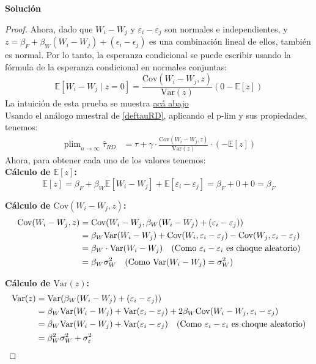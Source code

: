 \documentclass[a4paper, answers, addpoints, 11pt]{exam}
\DeclareMathOperator*{\plim}{plim}
\newenvironment{solucion}{%
  \begin{mdframed}[
    backgroundcolor=blue!5,    %
    linecolor=blue!50,          %
    linewidth=2pt,              %
    leftmargin=10pt,            %
    rightmargin=8pt,           %
    topline=true,              %
    bottomline=true,            %
    roundcorner=10pt,           %
    innerleftmargin=10pt,       %
    innerrightmargin=10pt,      %
    innerbottommargin=10pt,     %
    innertopmargin=10pt         %
  ]%
  \begin{tcolorbox}[colframe=blue!50!black, colback=blue!50, coltitle=white, sharp corners=all, boxrule=1mm, width=\textwidth, halign=left, valign=center, top=0mm, bottom=0mm, left=0mm, right=0mm] \textbf{Solución} \end{tcolorbox} }{\end{mdframed}}
\begin{document}
\begin{enumerate}[resume]
\begin{enumerate}
\begin{solucion}
\begin{proof}
Ahora, dado que \( W_i - W_j \) y \( \varepsilon_i - \varepsilon_j \) son normales e independientes, y \( z= \beta_F + \beta_W(W_i - W_j) + (\epsilon_i - \epsilon_j) \) es una combinación lineal de ellos, también es normal. Por lo tanto, la esperanza condicional se puede escribir usando la fórmula de la esperanza condicional en normales conjuntas:
\[
\mathbb{E}[W_i - W_j \mid z = 0] = \frac{\text{Cov}(W_i - W_j, z)}{\text{Var}(z)} (0 - \mathbb{E}[z])
\]
La intuición de esta prueba se muestra \hyperlink{claimesperanzacondicional}{acá abajo} \\
Usando el análogo muestral de \ref{deftauRD}, aplicando el p-lim y sus propiedades, tenemos:
\begin{align*}
\plim_{n \to \infty} \hat{\tau}_{RD} 
&=  \tau + \gamma \cdot \frac{\text{Cov}(W_i - W_j, z)}{\text{Var}(z)} \cdot (-\mathbb{E}[z])
\end{align*}
Ahora, para obtener cada uno de los valores tenemos:\\
\textbf{Cálculo de  \(\mathbb{E}[z]\):}
\[
\mathbb{E}[z] = \beta_F + \beta_W \mathbb{E}[ W_i - W_j] + \mathbb{E}[\varepsilon_i - \varepsilon_j] = \beta_F + 0 + 0 = \beta_F
\]

\textbf{Cálculo de \(\text{Cov}( W_i - W_j, z)\):}
\begin{align*}
\text{Cov}( W_i - W_j, z)  &= \text{Cov}( W_i - W_j, \beta_W ( W_i - W_j) + (\varepsilon_i - \varepsilon_j)) \\
&= \beta_W  \text{Var}( W_i - W_j) + \text{Cov}
 (  W_i  , \varepsilon_i-\varepsilon_j) -\text{Cov}
 (  W_j , \varepsilon_i-\varepsilon_j) \\
 &= \beta_W \cdot \text{Var}( W_i - W_j)   \quad \text{(Como $ \varepsilon_i-\varepsilon_i$ es choque aleatorio)}\\ 
 &= \beta_W \sigma_W^2 \quad \text{(Como $\text{Var}( W_i - W_j)=\sigma_W^2$)}
\end{align*}

 

\textbf{Cálculo de \(\text{Var}(z)\):}
\begin{align*}
\text{Var}(z) &= \text{Var}(\beta_W ( W_i - W_j) + (\varepsilon_i - \varepsilon_j))\\
& =  \beta_W \text{Var}( W_i - W_j) + \text{Var}(\varepsilon_i - \varepsilon_j)+ 2\beta_W  \text{Cov}(W_i - W_j, \varepsilon_i - \varepsilon_j) \\
& =  \beta_W \text{Var}( W_i - W_j) + \text{Var}(\varepsilon_i - \varepsilon_j) \quad \text{(Como $ \varepsilon_i-\varepsilon_i$ es choque aleatorio)}\\
& = \beta_W^2 \sigma_W^2 + \sigma_\varepsilon^2
\end{align*}



\end{proof}
\end{solucion}
\end{enumerate}
\end{enumerate}
\end{document}
